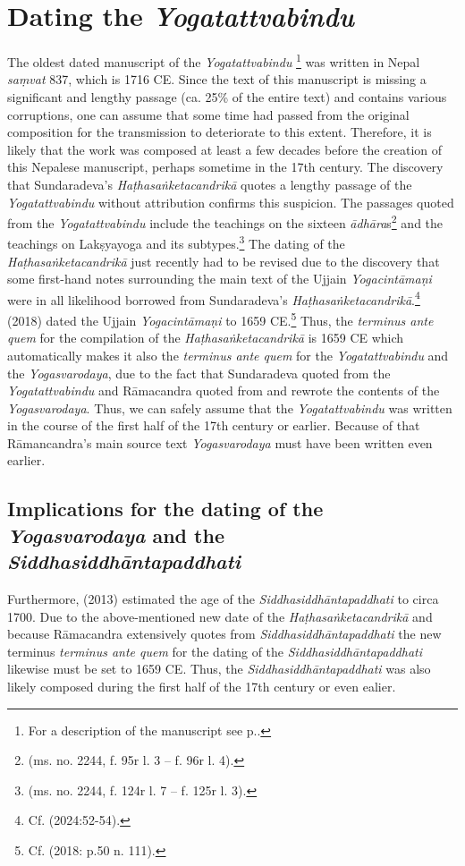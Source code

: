 \section{Dating the \textit{Yogatattvabindu}}
\label{dating}
The oldest dated manuscript of the \textit{Yogatattvabindu} \footnote{For a description of the manuscript see  p.\pageref{n1description}.} was written in Nepal \textit{saṃvat} 837, which is 1716 CE. Since the text of this manuscript is missing a significant and lengthy passage (ca. 25\% of the entire text) and contains various corruptions, one can assume that some time had passed from the original composition for the transmission to deteriorate to this extent. Therefore, it is likely that the work was composed at least a few decades before the creation of this Nepalese manuscript, perhaps sometime in the 17th century. The discovery that Sundaradeva's \textit{Haṭhasaṅketacandrikā} quotes a lengthy passage of the \textit{Yogatattvabindu} without attribution confirms this suspicion. The passages quoted from the \textit{Yogatattvabindu} include the teachings on the sixteen \textit{ādhāra}s\footnote{ (ms. no. 2244, f. 95r l. 3 -- f. 96r l. 4).} and the teachings on Lakṣyayoga and its subtypes.\footnote{ (ms. no. 2244, f. 124r l. 7 -- f. 125r l. 3).} The dating of the \textit{Haṭhasaṅketacandrikā} just recently had to be revised due to the discovery that some first-hand notes surrounding the main text of the Ujjain \textit{Yogacintāmaṇi} were in all likelihood borrowed from Sundaradeva's \textit{Haṭhasaṅketacandrikā}.\footnote{Cf. \citeauthor{birch2024} (2024:52-54).} \citeauthor{birch2018proliferation} (2018) dated the Ujjain \textit{Yogacintāmaṇi} to 1659 CE.\footnote{Cf. \citeauthor{birch2018proliferation} (2018: p.50 n. 111).} Thus, the \textit{terminus ante quem} for the compilation of the \textit{Haṭhasaṅketacandrikā} is 1659 CE which automatically makes it also the \textit{terminus ante quem} for the \textit{Yogatattvabindu} and the \textit{Yogasvarodaya}, due to the fact that Sundaradeva quoted from the \textit{Yogatattvabindu} and Rāmacandra quoted from and rewrote the contents of the \textit{Yogasvarodaya}. Thus, we can safely assume that the \textit{Yogatattvabindu} was written in the course of the first half of the 17th century or earlier. Because of that Rāmancandra's main source text \textit{Yogasvarodaya} must have been written even earlier.

\subsection{Implications for the dating of the \textit{Yogasvarodaya} and the \textit{Siddhasiddhāntapaddhati}}
Furthermore, \citeauthor{mallinsononline2013} (2013) estimated the age of the \textit{Siddhasiddhāntapaddhati} to circa 1700. Due to the above-mentioned new date of the \textit{Haṭhasaṅketacandrikā} and because Rāmacandra extensively quotes from \textit{Siddhasiddhāntapaddhati} the new terminus \textit{terminus ante quem} for the dating of the \textit{Siddhasiddhāntapaddhati} likewise must be set to 1659 CE. Thus, the \textit{Siddhasiddhāntapaddhati} was also likely composed during the first half of the 17th century or even ealier.

